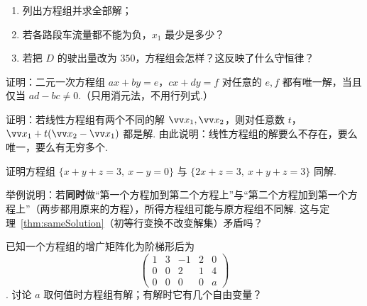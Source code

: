 {\begin{exA}
			\begin{enumerate}
				\item 列出方程组并求全部解；
				\item 若各路段车流量都不能为负，$x_1$ 最少是多少？
				\item 若把 $D$ 的驶出量改为 $350$，方程组会怎样？这反映了什么守恒律？
			\end{enumerate}
			\item\label{ex:elim:A17} 证明：二元一次方程组 $ax+by=e$，$cx+dy=f$ 对任意的 $e,f$ 都有唯一解，当且仅当 $ad-bc\ne0$.（只用消元法，不用行列式.）
			\item\label{ex:elim:A18} 证明：若线性方程组有两个不同的解 $\vv x_1,\vv x_2$，则对任意数 $t$，$\vv x_1+t(\vv x_2-\vv x_1)$ 都是解. 由此说明：线性方程组的解要么不存在，要么唯一，要么有无穷多个.
			\item\label{ex:elim:A19} 证明方程组 $\{x+y+z=3,\ x-y=0\}$ 与 $\{2x+z=3,\ x+y+z=3\}$ 同解.
			\item\label{ex:elim:A20} 举例说明：若\textbf{同时}做“第一个方程加到第二个方程上”与“第二个方程加到第一个方程上”（两步都用原来的方程），所得方程组可能与原方程组不同解. 这与定理~\ref{thm:sameSolution}（初等行变换不改变解集）矛盾吗？
			\item\label{ex:elim:A21} 已知一个方程组的增广矩阵化为阶梯形后为 $$\begin{pmatrix}1&3&-1&2&0\\0&0&2&1&4\\0&0&0&0&a\end{pmatrix}$$. 讨论 $a$ 取何值时方程组有解；有解时它有几个自由变量？
		\end{exA}
		
}

